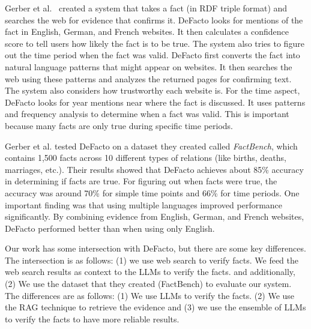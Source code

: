 Gerber et al.~\cite{GERBER201585} created a system that takes a fact (in RDF triple format) and searches the web for evidence that confirms it.
DeFacto looks for mentions of the fact in English, German, and French websites.
It then calculates a confidence score to tell users how likely the fact is to be true.
The system also tries to figure out the time period when the fact was valid.
DeFacto first converts the fact into natural language patterns that might appear on websites.
It then searches the web using these patterns and analyzes the returned pages for confirming text.
The system also considers how trustworthy each website is.
For the time aspect, DeFacto looks for year mentions near where the fact is discussed.
It uses patterns and frequency analysis to determine when a fact was valid.
This is important because many facts are only true during specific time periods.

Gerber et al. tested DeFacto on a dataset they created called \textit{FactBench}, which contains 1,500 facts across 10 different types of relations (like births, deaths, marriages, etc.).
Their results showed that DeFacto achieves about 85\% accuracy in determining if facts are true.
For figuring out when facts were true, the accuracy was around 70\% for simple time points and 66\% for time periods.
One important finding was that using multiple languages improved performance significantly.
By combining evidence from English, German, and French websites, DeFacto performed better than when using only English.

Our work has some intersection with DeFacto, but there are some key differences.
The intersection is as follows:
(1) we use web search to verify facts.
We feed the web search results as context to the \ac{LLMs} to verify the facts.
and additionally, (2) We use the dataset that they created (\ie FactBench) to evaluate our system.
The differences are as follows:
(1) We use \ac{LLMs} to verify the facts.
(2) We use the \ac{RAG} technique to retrieve the evidence and
(3) we use the ensemble of \ac{LLMs} to verify the facts to have more reliable results.

